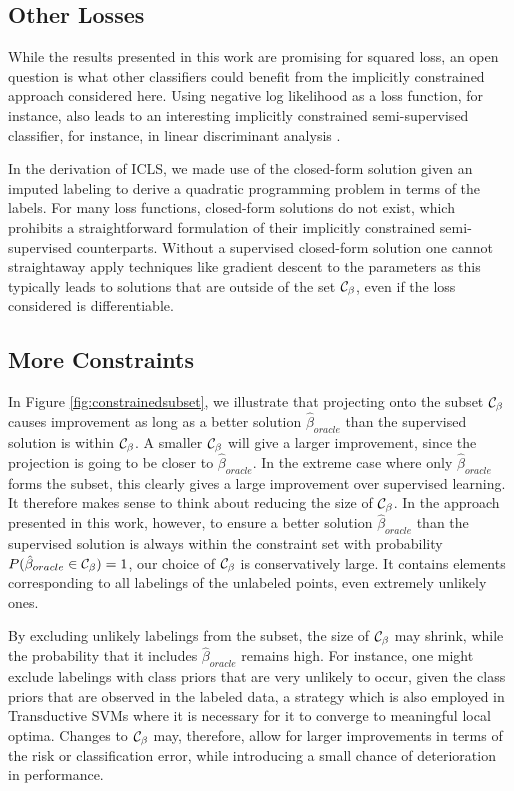 \documentclass{elsarticle}
\begin{document}
\subsection*{Other Losses}
While the results presented in this work are promising for squared loss, an open question is what other classifiers could benefit from the implicitly constrained approach considered here. Using negative log likelihood as a loss function, for instance, also leads to an interesting implicitly constrained semi-supervised classifier, for instance, in linear discriminant analysis \cite{Krijthe2014}. 

In the derivation of ICLS, we made use of the closed-form solution given an imputed labeling to derive a quadratic programming problem in terms of the labels. For many loss functions, closed-form solutions do not exist, which prohibits a straightforward formulation of their implicitly constrained semi-supervised counterparts. Without a supervised closed-form solution one cannot straightaway apply techniques like gradient descent to the parameters as this typically leads to solutions that are outside of the set $\mathcal{C}_{\beta}$, even if the loss considered is differentiable.

\subsection*{More Constraints}
In Figure \ref{fig:constrainedsubset}, we illustrate that projecting onto the subset $\mathcal{C}_{\beta}$ causes improvement as long as a better solution $\hat{\beta}_{oracle}$ than the supervised solution is within $\mathcal{C}_{\beta}$. A smaller $\mathcal{C}_{\beta}$ will give a larger improvement, since the projection is going to be closer to $\hat{\beta}_{oracle}$. In the extreme case where only $\hat{\beta}_{oracle}$ forms the subset, this clearly gives a large improvement over supervised learning. It therefore makes sense to think about reducing the size of $\mathcal{C}_{\beta}$. In the approach presented in this work, however, to ensure a better solution $\hat{\beta}_{oracle}$ than the supervised solution is always within the constraint set with probability $P(\hat{\beta}_{oracle} \in \mathcal{C}_{\beta})=1$, our choice of $\mathcal{C}_{\beta}$ is conservatively large. It contains elements corresponding to all labelings of the unlabeled points, even extremely unlikely ones. 

By excluding unlikely labelings from the subset, the size of $\mathcal{C}_{\beta}$ may shrink, while the probability that it includes $\hat{\beta}_{oracle}$ remains high. For instance, one might exclude labelings with class priors that are very unlikely to occur, given the class priors that are observed in the labeled data, a strategy which is also employed in Transductive SVMs where it is necessary for it to converge to meaningful local optima. Changes to $\mathcal{C}_{\beta}$ may, therefore, allow for larger improvements in terms of the risk or classification error, while introducing a small chance of deterioration in performance.
\end{document}
